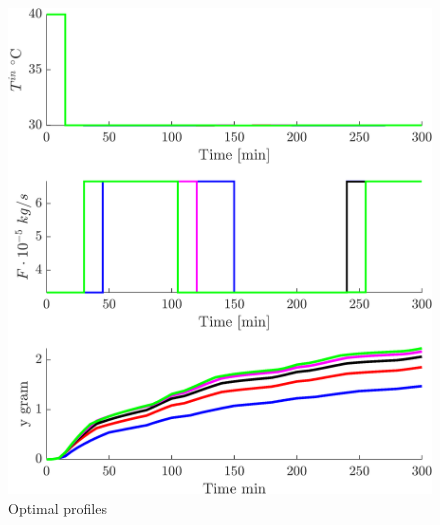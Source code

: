 \documentclass[../Article_Sensitivity_Analsysis.tex]{subfiles}
\begin{document}
	\begin{figure}[h!]
		\centering
		\includegraphics[width=\columnwidth]{Figures/Results/Profiles_all.png}	
		\caption{Optimal profiles}
		\label{fig:profiles}
	\end{figure}
	
\end{document}
